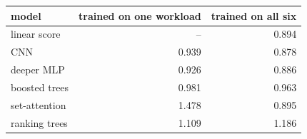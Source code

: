 \begin{tabular}{lrr}
\toprule
model & trained on one workload & trained on all six \\
\midrule
linear score & -- & 0.894 \\
CNN & 0.939 & 0.878 \\
deeper MLP & 0.926 & 0.886 \\
boosted trees & 0.981 & 0.963 \\
set-attention & 1.478 & 0.895 \\
ranking trees & 1.109 & 1.186 \\
\bottomrule
\end{tabular}
